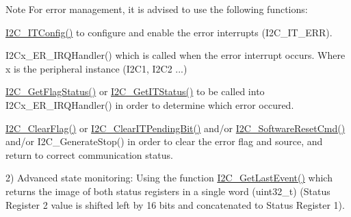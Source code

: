 \begin{DoxyItemize}
\begin{DoxyItemize}
\begin{DoxyNote}{Note}
For error management, it is advised to use the following functions\+:
\begin{DoxyItemize}
\item \hyperlink{group___i2_c___private___functions_ga58fed146a06cb81d2940604e460de047}{I2\+C\+\_\+\+I\+T\+Config()} to configure and enable the error interrupts (I2\+C\+\_\+\+I\+T\+\_\+\+E\+RR).
\item I2\+Cx\+\_\+\+E\+R\+\_\+\+I\+R\+Q\+Handler() which is called when the error interrupt occurs. Where x is the peripheral instance (I2\+C1, I2\+C2 ...)
\item \hyperlink{group___i2_c___private___functions_ga15c95d0ed124f029621a2061b1677ee7}{I2\+C\+\_\+\+Get\+Flag\+Status()} or \hyperlink{group___i2_c___private___functions_ga447771fbbd94a56f3570b9f430a069ba}{I2\+C\+\_\+\+Get\+I\+T\+Status()} to be called into I2\+Cx\+\_\+\+E\+R\+\_\+\+I\+R\+Q\+Handler() in order to determine which error occured.
\item \hyperlink{group___i2_c___private___functions_ga9d4f8fe9f7232696114b5578b1223963}{I2\+C\+\_\+\+Clear\+Flag()} or \hyperlink{group___i2_c___private___functions_ga110dda440fa200b5f77349df19b3e6bb}{I2\+C\+\_\+\+Clear\+I\+T\+Pending\+Bit()} and/or \hyperlink{group___i2_c___private___functions_ga1289c908aeb882443aba323b459c638b}{I2\+C\+\_\+\+Software\+Reset\+Cmd()} and/or I2\+C\+\_\+\+Generate\+Stop() in order to clear the error flag and source, and return to correct communication status.
\end{DoxyItemize}
\end{DoxyNote}
2) Advanced state monitoring\+: Using the function \hyperlink{group___i2_c___private___functions_ga29237aea9b5a3ead33167e1d027e9f1a}{I2\+C\+\_\+\+Get\+Last\+Event()} which returns the image of both status registers in a single word (uint32\+\_\+t) (Status Register 2 value is shifted left by 16 bits and concatenated to Status Register 1).
\end{DoxyItemize}
\end{DoxyItemize}

